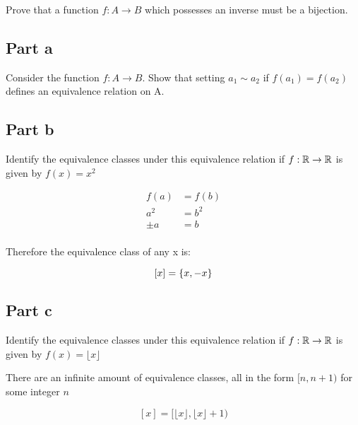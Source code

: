 \documentclass[12pt]{article} %
\begin{document}
\pagebreak

\begin{homeworkProblem}
    \begin{grayBoxed}
        Prove that a function $f: A \rightarrow B$ which possesses an inverse must be a bijection.
    \end{grayBoxed}
\end{homeworkProblem}

\pagebreak

\begin{homeworkProblem}
    \subsection*{Part a}

    \begin{grayBoxed}
        Consider the function $f: A \rightarrow B$. Show that setting $a_1 \sim a_2$ if $f(a_1) = f(a_2)$ defines an equivalence relation on A.
    \end{grayBoxed}


    \subsection*{Part b}

    \begin{grayBoxed}
        Identify the equivalence classes under this equivalence relation if $f: \mathbb{R} \rightarrow \mathbb{R}$ is given by $f(x) = x^2$
    \end{grayBoxed}

    \begin{align*}
        f(a)  & = f(b) \\
        a^2   & = b^2  \\
        \pm a & = b    \\
    \end{align*}

    Therefore the equivalence class of any x is:

    $$[x] = \left\{x, -x\right\}$$

    \subsection*{Part c}

    \begin{grayBoxed}
        Identify the equivalence classes under this equivalence relation if $f: \mathbb{R} \rightarrow \mathbb{R}$ is given by $f(x) = \lfloor x \rfloor$
    \end{grayBoxed}

    There are an infinite amount of equivalence classes, all in the form $[n, n + 1)$ for some integer $n$

    $$[x] = [\lfloor x\rfloor, \lfloor x\rfloor + 1)$$

\end{homeworkProblem}
\end{document}
